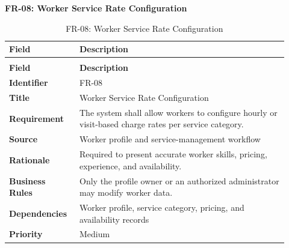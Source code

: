 \documentclass[12pt,a4paper]{article}
\begin{document}
\noindent\textbf{FR-08: Worker Service Rate Configuration}\par
\vspace{4pt}
\begingroup\small\setlength{\tabcolsep}{4pt}\renewcommand{\arraystretch}{1.15}
\begin{longtable}{|>{\raggedright\arraybackslash}p{0.22\linewidth}|>{\raggedright\arraybackslash}p{0.70\linewidth}|}
\caption{FR-08: Worker Service Rate Configuration}\label{tab:fr-08}\\
\hline
\textbf{Field} & \textbf{Description} \\ \hline
\endfirsthead
\multicolumn{2}{c}{Table \thetable\ Worker Service Rate Configuration (continued)}\\
\hline
\textbf{Field} & \textbf{Description} \\ \hline
\endhead
\textbf{Identifier} & FR-08 \\ \hline
\textbf{Title} & Worker Service Rate Configuration \\ \hline
\textbf{Requirement} & The system shall allow workers to configure hourly or visit-based charge rates per service category. \\ \hline
\textbf{Source} & Worker profile and service-management workflow \\ \hline
\textbf{Rationale} & Required to present accurate worker skills, pricing, experience, and availability. \\ \hline
\textbf{Business Rules} & Only the profile owner or an authorized administrator may modify worker data. \\ \hline
\textbf{Dependencies} & Worker profile, service category, pricing, and availability records \\ \hline
\textbf{Priority} & Medium \\ \hline
\end{longtable}
\endgroup
\clearpage
\end{document}
